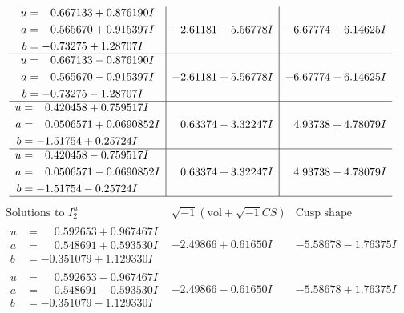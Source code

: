\documentclass[1p]{elsarticle_modified}
\theoremstyle{definition}
\newcommand{\I}{\sqrt{-1}}
\begin{document}
$$\begin{array}{c|c|c}
\begin{aligned}
u &= \phantom{-}0.667133 + 0.876190 I \\
a &= \phantom{-}0.565670 + 0.915397 I \\
b &= -0.73275 + 1.28707 I\end{aligned}
 & -2.61181 - 5.56778 I & -6.67774 + 6.14625 I \\ \hline\begin{aligned}
u &= \phantom{-}0.667133 - 0.876190 I \\
a &= \phantom{-}0.565670 - 0.915397 I \\
b &= -0.73275 - 1.28707 I\end{aligned}
 & -2.61181 + 5.56778 I & -6.67774 - 6.14625 I \\ \hline\begin{aligned}
u &= \phantom{-}0.420458 + 0.759517 I \\
a &= \phantom{-}0.0506571 + 0.0690852 I \\
b &= -1.51754 + 0.25724 I\end{aligned}
 & \phantom{-}0.63374 - 3.32247 I & \phantom{-}4.93738 + 4.78079 I \\ \hline\begin{aligned}
u &= \phantom{-}0.420458 - 0.759517 I \\
a &= \phantom{-}0.0506571 - 0.0690852 I \\
b &= -1.51754 - 0.25724 I\end{aligned}
 & \phantom{-}0.63374 + 3.32247 I & \phantom{-}4.93738 - 4.78079 I\\
 \hline 
 \end{array}$$\newpage$$\begin{array}{c|c|c}  
\text{Solutions to }I^u_{2}& \I (\text{vol} + \sqrt{-1}CS) & \text{Cusp shape}\\
 \hline 
\begin{aligned}
u &= \phantom{-}0.592653 + 0.967467 I \\
a &= \phantom{-}0.548691 + 0.593530 I \\
b &= -0.351079 + 1.129330 I\end{aligned}
 & -2.49866 + 0.61650 I & -5.58678 - 1.76375 I \\ \hline\begin{aligned}
u &= \phantom{-}0.592653 - 0.967467 I \\
a &= \phantom{-}0.548691 - 0.593530 I \\
b &= -0.351079 - 1.129330 I\end{aligned}
 & -2.49866 - 0.61650 I & -5.58678 + 1.76375 I \\ \hline\begin{aligned}

\end{aligned}
\end{array}$$
\end{document}
